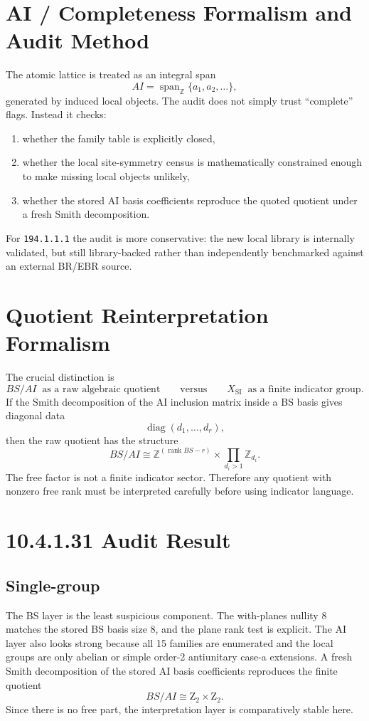 \documentclass[11pt]{article}
\begin{document}
\section{AI / Completeness Formalism and Audit Method}
The atomic lattice is treated as an integral span
\[
  AI = \operatorname{span}_{\mathbb{Z}}\{a_1,a_2,\dots\},
\]
generated by induced local objects. The audit does not simply trust ``complete'' flags. Instead it checks:
\begin{enumerate}
\item whether the family table is explicitly closed,
\item whether the local site-symmetry census is mathematically constrained enough to make missing local objects unlikely,
\item whether the stored AI basis coefficients reproduce the quoted quotient under a fresh Smith decomposition.
\end{enumerate}
For \texttt{194.1.1.1} the audit is more conservative: the new local library is internally validated, but still library-backed rather than independently benchmarked against an external BR/EBR source.

\section{Quotient Reinterpretation Formalism}
The crucial distinction is
\[
  BS/AI \;\; \text{as a raw algebraic quotient}
  \qquad \text{versus} \qquad
  X_{\mathrm{SI}} \;\; \text{as a finite indicator group}.
\]
If the Smith decomposition of the AI inclusion matrix inside a BS basis gives diagonal data
\[
  \operatorname{diag}(d_1,\dots,d_r),
\]
then the raw quotient has the structure
\[
  BS/AI \cong \mathbb{Z}^{(\operatorname{rank} BS-r)} \times \prod_{d_i>1} \mathbb{Z}_{d_i}.
\]
The free factor is not a finite indicator sector. Therefore any quotient with nonzero free rank must be interpreted carefully before using indicator language.

\section{10.4.1.31 Audit Result}
\subsection*{Single-group}
The BS layer is the least suspicious component. The with-planes nullity $8$ matches the stored BS basis size $8$, and the plane rank test is explicit. The AI layer also looks strong because all 15 families are enumerated and the local groups are only abelian or simple order-2 antiunitary case-a extensions. A fresh Smith decomposition of the stored AI basis coefficients reproduces the finite quotient
\[
  BS/AI \cong \mathrm{Z}_{2} \times \mathrm{Z}_{2}.
\]
Since there is no free part, the interpretation layer is comparatively stable here.
\end{document}
